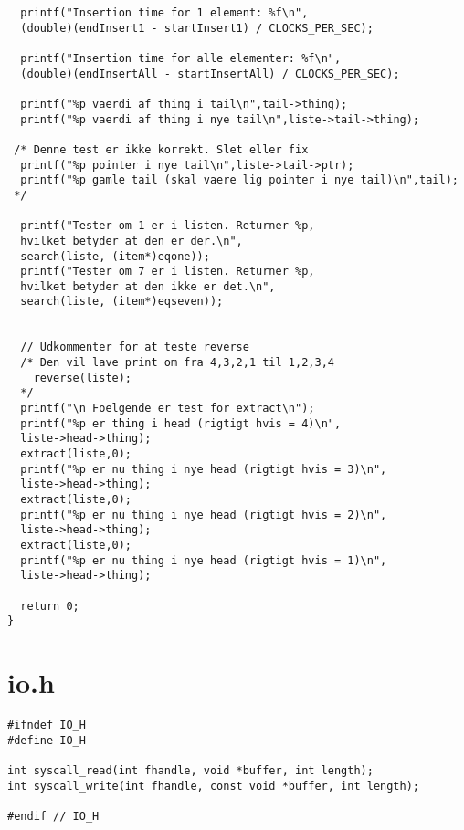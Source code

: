\documentclass[a4paper,12pt]{article}
\begin{document}
\begin{lstlisting}
  printf("Insertion time for 1 element: %f\n",
  (double)(endInsert1 - startInsert1) / CLOCKS_PER_SEC);

  printf("Insertion time for alle elementer: %f\n",
  (double)(endInsertAll - startInsertAll) / CLOCKS_PER_SEC);

  printf("%p vaerdi af thing i tail\n",tail->thing);
  printf("%p vaerdi af thing i nye tail\n",liste->tail->thing);

 /* Denne test er ikke korrekt. Slet eller fix
  printf("%p pointer i nye tail\n",liste->tail->ptr);
  printf("%p gamle tail (skal vaere lig pointer i nye tail)\n",tail);
 */

  printf("Tester om 1 er i listen. Returner %p, 
  hvilket betyder at den er der.\n",
  search(liste, (item*)eqone));
  printf("Tester om 7 er i listen. Returner %p, 
  hvilket betyder at den ikke er det.\n",
  search(liste, (item*)eqseven));


  // Udkommenter for at teste reverse
  /* Den vil lave print om fra 4,3,2,1 til 1,2,3,4
    reverse(liste);
  */
  printf("\n Foelgende er test for extract\n");
  printf("%p er thing i head (rigtigt hvis = 4)\n",
  liste->head->thing);
  extract(liste,0);
  printf("%p er nu thing i nye head (rigtigt hvis = 3)\n",
  liste->head->thing);
  extract(liste,0);
  printf("%p er nu thing i nye head (rigtigt hvis = 2)\n",
  liste->head->thing);
  extract(liste,0);
  printf("%p er nu thing i nye head (rigtigt hvis = 1)\n",
  liste->head->thing);

  return 0;
}

\end{lstlisting}
\newpage

\section*{io.h}
\begin{lstlisting}
#ifndef IO_H
#define IO_H

int syscall_read(int fhandle, void *buffer, int length);
int syscall_write(int fhandle, const void *buffer, int length);

#endif // IO_H
\end{lstlisting}
\newpage
\end{document}
